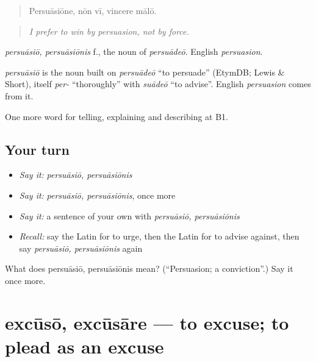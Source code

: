 \begin{quote}
Persuāsiōne, nōn vī, vincere mālō.
\end{quote}

\begin{quote}
\emph{I prefer to win by persuasion, not by force.}
\end{quote}

\emph{persuāsiō, persuāsiōnis} f., the noun of \emph{persuādeō}. English \emph{persuasion}.

\begin{cousinweb}
\emph{persuāsiō} is the noun built on \emph{persuādeō} \textquotedblleft{}to persuade\textquotedblright{} (EtymDB; Lewis \& Short), itself \emph{per-} \textquotedblleft{}thoroughly\textquotedblright{} with \emph{suādeō} \textquotedblleft{}to advise\textquotedblright{}. English \emph{persuasion} comes from it.
\end{cousinweb}

\begin{grammarlens}[title={What you've built}]
One more word for telling, explaining and describing at B1.
\end{grammarlens}

\subsection*{Your turn}
\begin{itemize}
\raggedright
  \item \emph{Say it:} \emph{persuāsiō, persuāsiōnis}
  \item \emph{Say it:} \emph{persuāsiō, persuāsiōnis}, once more
  \item \emph{Say it:} a sentence of your own with \emph{persuāsiō, persuāsiōnis}
  \item \emph{Recall:} say the Latin for to urge, then the Latin for to advise against, then say \emph{persuāsiō, persuāsiōnis} again
\end{itemize}

\begin{tcolorbox}[breakable,colback=teal!4,colframe=teal!35!black,title={Before you move on}]
What does persuāsiō, persuāsiōnis mean? (\textquotedblleft{}Persuasion; a conviction\textquotedblright{}.) Say it once more.
\end{tcolorbox}
\section[excūsō, excūsāre]{excūsō, excūsāre — to excuse; to plead as an excuse}

